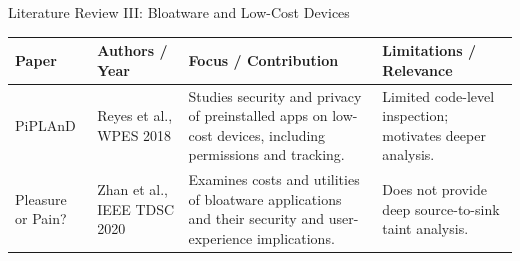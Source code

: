 \documentclass[aspectratio=169,10pt]{beamer}
\newcommand{\tbl}{\footnotesize\setlength{\tabcolsep}{3pt}\renewcommand{\arraystretch}{1.3}}
\begin{document}

\begin{frame}{Literature Review III: Bloatware and Low-Cost Devices}

\begin{table}
\centering
\tbl

\begin{tabular}{|L{.18}|L{.15}|L{.31}|L{.28}|}
\hline

\textbf{Paper} &
\textbf{Authors / Year} &
\textbf{Focus / Contribution} &
\textbf{Limitations / Relevance}\\
\hline

PiPLAnD &
Reyes et al., WPES 2018 &
Studies security and privacy of preinstalled apps on low-cost devices, including permissions and tracking. &
Limited code-level inspection; motivates deeper analysis.\\
\hline

Pleasure or Pain? &
Zhan et al., IEEE TDSC 2020 &
Examines costs and utilities of bloatware applications and their security and user-experience implications. &
Does not provide deep source-to-sink taint analysis.\\
\hline

\end{tabular}
\end{table}

\end{frame}

\end{document}
